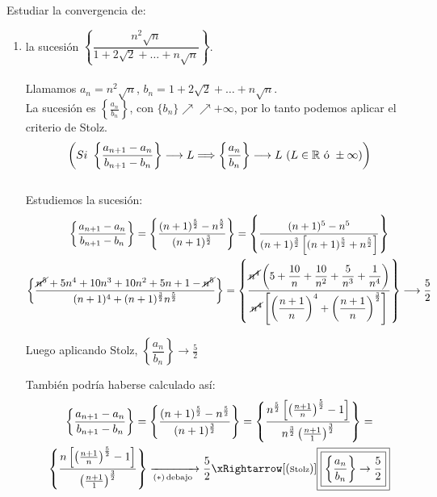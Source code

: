 \documentclass[12pt]{article}
\begin{document}
	\newpage
	
	\begin{ejercicio}[2 puntos] Estudiar la convergencia de:
		\begin{enumerate}
			\item la sucesión $\left\{\dfrac{n^2 \sqrt{n}}{1+2\sqrt{2}+ \dots + n\sqrt{n}}\right\}$. \\
			\\
			Llamamos $a_n = n^2\sqrt{n}$,  $b_n = 1+2\sqrt{2}+ \dots + n\sqrt{n}$. \\
			La sucesión es $\left\{\frac{a_n}{b_n}\right\}$, con $\{b_n\} \nearrow\nearrow +\infty$, por lo tanto podemos aplicar el criterio de Stolz.
			\begin{equation*}
				\left(Si \  \left\{\dfrac{a_{n+1} - a_n}{b_{n+1} - b_n}\right\} \longrightarrow L \Longrightarrow \left\{\dfrac{a_n}{b_n}\right\} \longrightarrow L \ (L \in {\mathbb{R}} \text{ ó } \pm \infty) \right)
			\end{equation*} \\
			Estudiemos la sucesión:
			\begin{gather*}
				\left\{\dfrac{a_{n+1} - a_n}{b_{n+1} - b_n}\right\} = \left\{\dfrac{(n+1)^{\frac{5}{2}} - n^{\frac{5}{2}}}{(n+1)^{\frac{3}{2}}}\right\} = \left\{\dfrac{(n+1)^5- n^5}{(n+1)^{\frac{3}{2}} \left[(n+1)^{\frac{5}{2}} + n^{\frac{5}{2}}\right]}\right\} \\ \left\{\dfrac{\cancel{n^5} +5n^4+10n^3+10n^2+5n+1 - \cancel{n^5}}{(n+1)^4 + (n+1)^\frac{3}{2}n^\frac{5}{2}}\right\}= \left\{\dfrac{\cancel{n^4}\left(5+\dfrac{10}{n}+\dfrac{10}{n^2} + \dfrac{5}{n^3} + \dfrac{1}{n^4}\right)}{\cancel{n^4} \left[\left(\dfrac{n+1}{n}\right)^4 + \left(\dfrac{n+1}{n}\right)^\frac{3}{2}\right]}\right\} \longrightarrow \dfrac{5}{2}
			\end{gather*}
			
			Luego aplicando Stolz, $\boxed{\boxed{\left\{\dfrac{a_n}{b_n}\right\} \rightarrow \frac{5}{2}}}$
			
			 \hrulefill 
			
			También podría haberse calculado así: 
			\begin{gather*}
				\left\{\dfrac{a_{n+1} - a_n}{b_{n+1} - b_n}\right\} = \left\{\dfrac{(n+1)^{\frac{5}{2}} - n^{\frac{5}{2}}}{(n+1)^{\frac{3}{2}}}\right\} = \left\{\frac{n^{\frac{5}{2}}\left[\left(\frac{n+1}{n}\right)^{\frac{5}{2}} - 1\right]}{n^{\frac{3}{2}}\left(\frac{n+1}{1}\right)^{\frac{3}{2}} }\right\} = \\
				\left\{\frac{n\left[\left(\frac{n+1}{n}\right)^{\frac{5}{2}} - 1\right]}{\left(\frac{n+1}{1}\right)^{\frac{3}{2}} }\right\} 
				\xrightarrow[ \left(\ast\right) \, \text{\scriptsize debajo }]{} \frac{5}{2} \xRightarrow[\left(\text{\scriptsize Stolz}\right)]{} \boxed{\boxed{\left\{\dfrac{a_n}{b_n}\right\} \rightarrow \frac{5}{2}}}
			\end{gather*}
      	  	

\end{enumerate}
\end{ejercicio}
\end{document}
